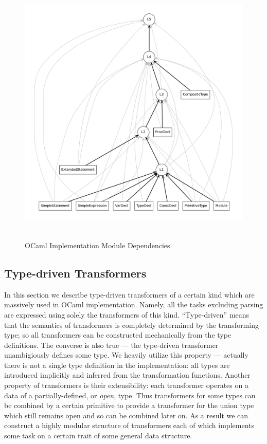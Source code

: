 \begin{figure}[h]
\begin{center}
\includegraphics[height=13cm, width=14cm]{ocaml/depend.pdf}
\end{center}
\label{ocamlmoddep}
\caption{OCaml Implementation Module Dependencies}
\end{figure}

\subsection{Type-driven Transformers}

In this section we describe type-driven transformers of a certain kind which are 
massively used in OCaml implementation. Namely, all the tasks excluding parsing
are expressed using solely the transformers of this kind. ``Type-driven'' means that
the semantics of transformers is completely determined by the transforming type; 
so all transformers can be constructed mechanically from the type definitions.
The converse is also true --- the type-driven transformer unambigiously defines
some type. We heavily utilize this property --- actually there is not a single 
type definition in the implementation: all types are introduced implicitly 
and inferred from the transformation functions. Another property of transformers
is their extensibility: each transformer operates on a data of a partially-defined, 
or \emph{open}, type. Thus transformers for some types can be combined by a certain primitive
to provide a transformer for the union type which still remains open and so can be
combined later on. As a result we can construct a highly modular structure of
transformers each of which implements some task on a certain trait of some general
data structure. 

